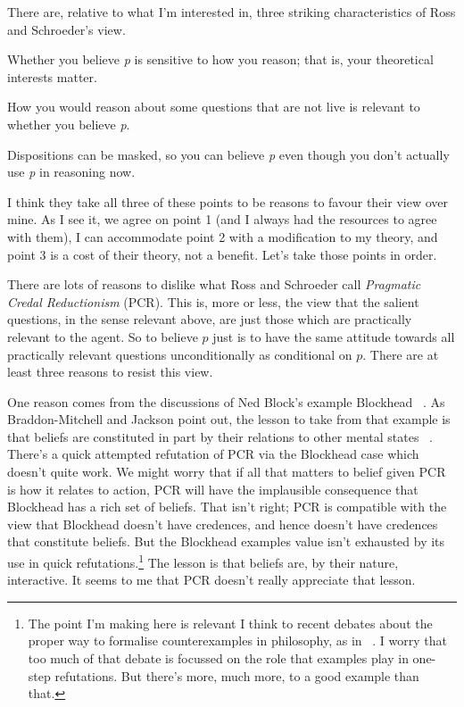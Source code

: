 \noindent There are, relative to what I'm interested in, three striking characteristics of Ross and Schroeder's view.

\begin{enumerate*}
\item Whether you believe \emph{p} is sensitive to how you reason; that is, your theoretical interests matter.

\item How you would reason about some questions that are not live is relevant to whether you believe \emph{p}.

\item Dispositions can be masked, so you can believe \emph{p} even though you don't actually use \emph{p} in reasoning now.

\end{enumerate*}

I think they take all three of these points to be reasons to favour their view over mine. As I see it, we agree on point 1 (and I always had the resources to agree with them), I can accommodate point 2 with a modification to my theory, and point 3 is a cost of their theory, not a benefit. Let's take those points in order.

There are lots of reasons to dislike what Ross and Schroeder call \emph{Pragmatic Credal Reductionism} (PCR). This is, more or less, the view that the salient questions, in the sense relevant above, are just those which are practically relevant to the agent. So to believe $p$ just is to have the same attitude towards all practically relevant questions unconditionally as conditional on $p$. There are at least three reasons to resist this view.

One reason comes from the discussions of Ned Block's example Blockhead ~\citep{Block1978}. As Braddon-Mitchell and Jackson point out, the lesson to take from that example is that beliefs are constituted in part by their relations to other mental states ~\citep[114ff]{DBMJackson2007}. There's a quick attempted refutation of PCR via the Blockhead case which doesn't quite work. We might worry that if all that matters to belief given PCR is how it relates to action, PCR will have the implausible consequence that Blockhead has a rich set of beliefs. That isn't right; PCR is compatible with the view that Blockhead doesn't have credences, and hence doesn't have credences that constitute beliefs. But the Blockhead examples value isn't exhausted by its use in quick refutations.\footnote{The point I'm making here is relevant I think to recent debates about the proper way to formalise counterexamples in philosophy, as in ~\citep{Williamson2007-WILTPO-17, IchikawaJarvis2009, Malmgren2011}. I worry that too much of that debate is focussed on the role that examples play in one-step refutations. But there's more, much more, to a good example than that.} The lesson is that beliefs are, by their nature, interactive. It seems to me that PCR doesn't really appreciate that lesson.


